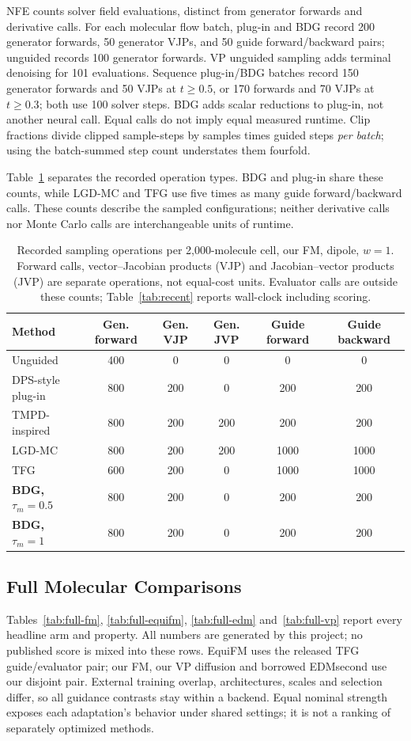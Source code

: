 \documentclass{article}
\begin{document}
NFE counts solver field evaluations, distinct from generator forwards and derivative calls. For each molecular flow batch, plug-in and BDG record 200 generator forwards, 50 generator VJPs, and 50 guide forward/backward pairs; unguided records 100 generator forwards. VP unguided sampling adds terminal denoising for 101 evaluations. Sequence plug-in/BDG batches record 150 generator forwards and 50 VJPs at $t\ge0.5$, or 170 forwards and 70 VJPs at $t\ge0.3$; both use 100 solver steps. BDG adds scalar reductions to plug-in, not another neural call. Equal calls do not imply equal measured runtime. Clip fractions divide clipped sample-steps by samples times guided steps \emph{per batch}; using the batch-summed step count understates them fourfold.

Table~\ref{tab:cost} separates the recorded operation types. BDG and plug-in share these counts, while LGD-MC and TFG use five times as many guide forward/backward calls. These counts describe the sampled configurations; neither derivative calls nor Monte Carlo calls are interchangeable units of runtime.
\begin{table}[!htbp]
\centering\small
\caption{Recorded sampling operations per 2,000-molecule cell, our FM, dipole, $w=1$. Forward calls, vector--Jacobian products (VJP) and Jacobian--vector products (JVP) are separate operations, not equal-cost units. Evaluator calls are outside these counts; Table~\ref{tab:recent} reports wall-clock including scoring.}
\label{tab:cost}
\begin{tabular}{lccccc}
\toprule
Method & Gen. forward & Gen. VJP & Gen. JVP & Guide forward & Guide backward\\
\midrule
Unguided & 400 & 0 & 0 & 0 & 0\\
DPS-style plug-in & 800 & 200 & 0 & 200 & 200\\
TMPD-inspired & 800 & 200 & 200 & 200 & 200\\
LGD-MC & 800 & 200 & 200 & 1000 & 1000\\
TFG & 600 & 200 & 0 & 1000 & 1000\\
\textbf{BDG, $\tau_m=0.5$} & 800 & 200 & 0 & 200 & 200\\
\textbf{BDG, $\tau_m=1$} & 800 & 200 & 0 & 200 & 200\\
\bottomrule
\end{tabular}
\end{table}

\subsection{Full Molecular Comparisons}\label{app:comparisons}
Tables~\ref{tab:full-fm}, \ref{tab:full-equifm}, \ref{tab:full-edm} and~\ref{tab:full-vp} report every headline arm and property. All numbers are generated by this project; no published score is mixed into these rows. EquiFM uses the released TFG guide/evaluator pair; our FM, our VP diffusion and borrowed EDMsecond use our disjoint pair. External training overlap, architectures, scales and selection differ, so all guidance contrasts stay within a backend. Equal nominal strength exposes each adaptation's behavior under shared settings; it is not a ranking of separately optimized methods.
\end{document}
